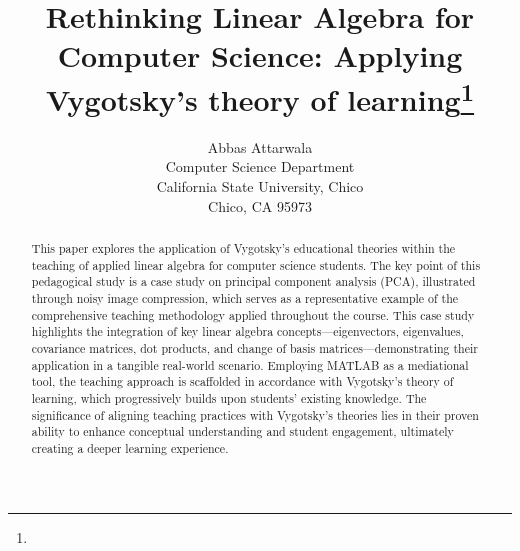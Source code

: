 \documentclass{article}
\title{Rethinking Linear Algebra for Computer Science: Applying Vygotsky's theory of learning\footnote{\protect}
}
\author{
    Abbas Attarwala\\
    Computer Science Department\\
    California State University, Chico\\
    Chico, CA 95973\\
    \email{aattarwala@csuchico.edu}
  }
\begin{document}
\maketitle

\begin{abstract}
 This paper explores the application of Vygotsky's educational theories within the teaching of applied linear algebra for computer science students. 
 The key point of this pedagogical study is a case study on principal component analysis (PCA), illustrated through noisy image compression, which serves as a representative example of the comprehensive teaching methodology applied throughout the course. 
 This case study highlights the integration of key linear algebra concepts—eigenvectors, eigenvalues, covariance matrices, dot products, and change of basis matrices—demonstrating their application in a tangible real-world scenario. 
 Employing MATLAB as a mediational tool, the teaching approach is scaffolded in accordance with Vygotsky's theory of learning, which progressively builds upon students' existing knowledge. 
 The significance of aligning teaching practices with Vygotsky's theories lies in their proven ability to enhance conceptual understanding and student engagement, ultimately creating a deeper learning experience. 

\end{abstract}
\end{document}
